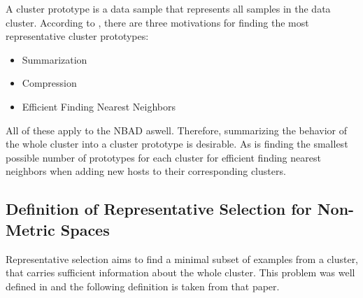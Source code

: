 \documentclass[thesis=B,english]{FITthesis}[2012/10/20]
\begin{document}
A cluster prototype is a data sample that represents all samples in the data cluster.
According to \cite{tan2014introduction}, there are three motivations for finding the most representative cluster prototypes:
\begin{itemize}
    \item Summarization
    \item Compression
    \item Efficient Finding Nearest Neighbors
\end{itemize}
All of these apply to the NBAD aswell.
Therefore, summarizing the behavior of the whole cluster into a cluster prototype is desirable.
As is finding the smallest possible number of prototypes for each cluster for efficient finding nearest neighbors when adding new hosts to their corresponding clusters.

\subsection{Definition of Representative Selection for Non-Metric Spaces}\label{sec:def_rep_selection}
Representative selection aims to find a minimal subset of examples from a cluster, that carries sufficient information about the whole cluster.
This problem was well defined in \cite{liebman2015representative} and the following definition is taken from that paper.
\end{document}
